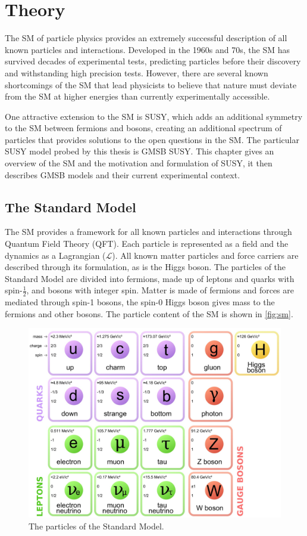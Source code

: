 \chapter{Theory}
\label{chap:theory}

The \acf{SM} of particle physics provides an extremely successful description of all known particles and interactions. Developed in the 1960s and 70s, the \ac{SM} has survived decades of experimental tests, predicting particles before their discovery and withstanding high precision tests. However, there are several known shortcomings of the \ac{SM} that lead physicists to believe that nature must deviate from the \ac{SM} at higher energies than currently experimentally accessible. 

One attractive extension to the \ac{SM} is \acf{SUSY}, which adds an additional symmetry to the \ac{SM} between fermions and bosons, creating an additional spectrum of particles that provides solutions to the open questions in the \ac{SM}. The particular \ac{SUSY} model probed by this thesis is \acf{GMSB} \ac{SUSY}. This chapter gives an overview of the \ac{SM} and the motivation and formulation of \ac{SUSY}, it then describes \ac{GMSB} models and their current experimental context. 


\section{The Standard Model}

The \acf{SM} provides a framework for all known particles and interactions through Quantum Field Theory (QFT). Each particle is represented as a field and the dynamics as a Lagrangian ($\mathcal{L}$). All known matter particles and force carriers are described through its formulation, as is the Higgs boson. The particles of the Standard Model are divided into fermions, made up of leptons and quarks with spin-$\frac{1}{2}$, and bosons with integer spin. Matter is made of fermions and forces are mediated through spin-1 bosons, the spin-0 Higgs boson gives mass to the fermions and other bosons. The particle content of the \ac{SM} is shown in \autoref{fig:sm}. 
 
\begin{figure}[htbp]
\centering
\includegraphics[width=.8\textwidth]{figures/theory/standard-model.jpg}
\caption{The particles of the Standard Model.}
\label{fig:sm}
\end{figure}



